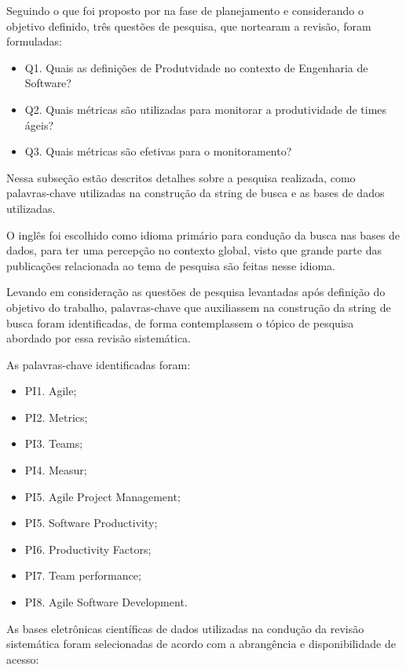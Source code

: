 Seguindo o que foi proposto por \cite{Brereton:2007:LAS:1225950.1226109} na fase
de planejamento e considerando o objetivo definido, três questões de pesquisa,
que nortearam a revisão, foram formuladas:

\begin{itemize}
  \item Q1. Quais as definições de Produtvidade no contexto de Engenharia de Software?
  \item Q2. Quais métricas são utilizadas para monitorar a produtividade de times ágeis?
  \item Q3. Quais métricas são efetivas para o monitoramento?
\end{itemize}

Nessa subseção estão descritos detalhes sobre a pesquisa realizada, como palavras-chave
utilizadas na construção da string de busca e as bases de dados utilizadas.

O inglês foi escolhido como idioma primário para condução da busca nas bases de dados,
para ter uma percepção no contexto global, visto que grande parte das publicações relacionada ao
tema de pesquisa são feitas nesse idioma.

Levando em consideração as questões de pesquisa levantadas após definição do objetivo do
trabalho, palavras-chave que auxiliassem na construção da string de busca foram identificadas, de
forma contemplassem o tópico de pesquisa abordado por essa revisão sistemática.

As palavras-chave identificadas foram:

\begin{itemize}
  \item PI1. Agile;
  \item PI2. Metrics;
  \item PI3. Teams;
  \item PI4. Measur;
  \item PI5. Agile Project Management;
  \item PI5. Software Productivity;
  \item PI6. Productivity Factors;
  \item PI7. Team performance;
  \item PI8. Agile Software Development.
\end{itemize}

As bases eletrônicas científicas de dados utilizadas na condução da revisão sistemática
foram selecionadas de acordo com a abrangência e disponibilidade de acesso:

